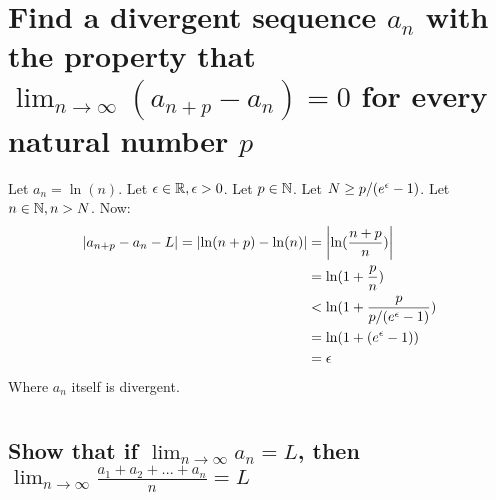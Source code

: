 \documentclass[10pt, letterpaper, titlepage]{article}
\newcommand\limntoinfty{\lim_{n \to \infty}}
\begin{document}
    \section{Find a divergent sequence $a_n$ with the property that 
      $\limntoinfty (a_{n+p} - a_n) = 0$ for every natural number $p$}
      Let $a_n = \ln(n)$.
      Let $\epsilon\in\mathbb{R}, \epsilon > 0$.
      Let $p \in \mathbb{N}$.
      Let $N \geq p/(e^\epsilon - 1)$.
      Let $n \in \mathbb{N}, n > N$.
      Now:
      \begin{align*}
        \left|a_{n+p} - a_n - L\right| = \left|\ln(n+p) - \ln(n)\right|
        &= \left|\ln(\frac{n+p}{n})\right| \\ 
        &= \ln(1 + \frac{p}{n}) \\ 
        &< \ln(1 + \frac{p}{p/(e^\epsilon - 1)}) \\ 
        &= \ln(1 + (e^\epsilon - 1)) \\ 
        &= \epsilon \\ 
      \end{align*}
      Where $a_n$ itself is divergent.


    \newpage
    \section{}
      \subsection{Show that if $\limntoinfty a_n = L$, 
        then $\limntoinfty \frac{a_1 + a_2 + \dots + a_n}{n} = L$}

        
        
\end{document}

